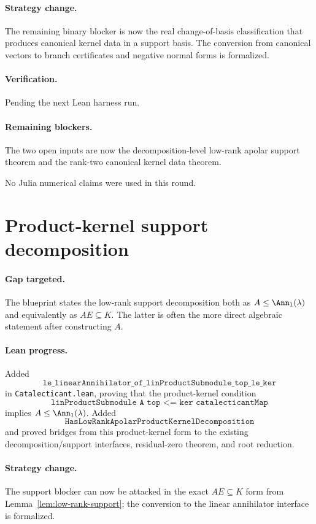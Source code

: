 \documentclass[11pt]{article}
\begin{document}
\paragraph{Strategy change.}
The remaining binary blocker is now the real change-of-basis classification
that produces canonical kernel data in a support basis.  The conversion from
canonical vectors to branch certificates and negative normal forms is
formalized.

\paragraph{Verification.}
Pending the next Lean harness run.

\paragraph{Remaining blockers.}
The two open inputs are now the decomposition-level low-rank apolar support
theorem and the rank-two canonical kernel data theorem.

No Julia numerical claims were used in this round.

\section*{Product-kernel support decomposition}

\paragraph{Gap targeted.}
The blueprint states the low-rank support decomposition both as
\(A\le\Ann_1(\lambda)\) and equivalently as \(AE\subseteq K\).  The latter is
often the more direct algebraic statement after constructing \(A\).

\paragraph{Lean progress.}
Added
\[
\texttt{le\_linearAnnihilator\_of\_linProductSubmodule\_top\_le\_ker}
\]
in \texttt{Catalecticant.lean}, proving that the product-kernel condition
\[
\texttt{linProductSubmodule A top <= ker catalecticantMap}
\]
implies \(A\le\Ann_1(\lambda)\).  Added
\[
\texttt{HasLowRankApolarProductKernelDecomposition}
\]
and proved bridges from this product-kernel form to the existing
decomposition/support interfaces, residual-zero theorem, and root reduction.

\paragraph{Strategy change.}
The support blocker can now be attacked in the exact \(AE\subseteq K\)
form from Lemma~\ref{lem:low-rank-support}; the conversion to the linear
annihilator interface is formalized.
\end{document}
